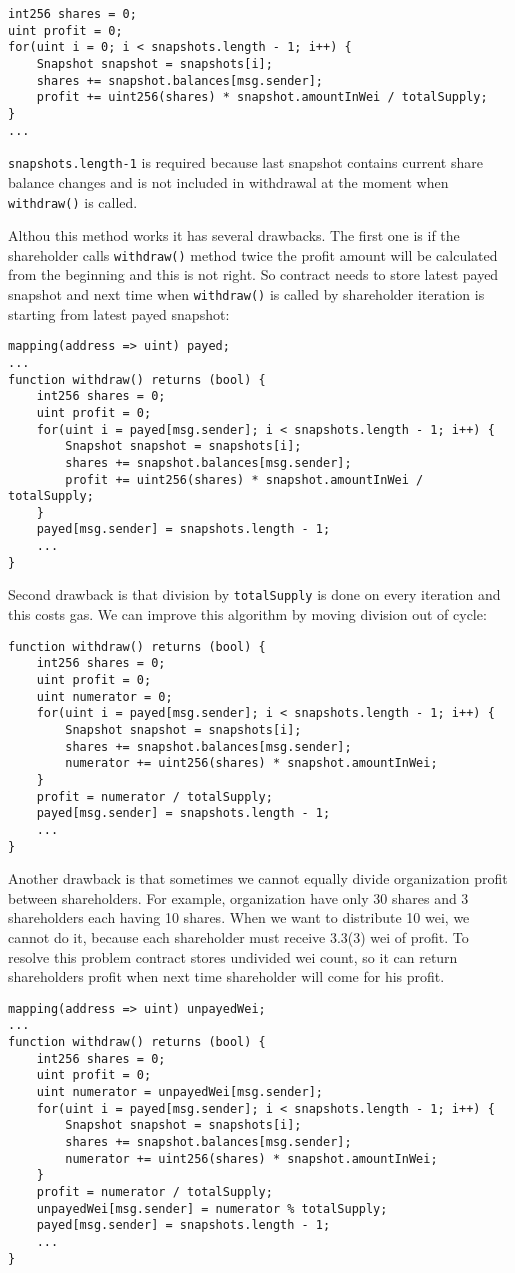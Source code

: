 \documentclass[onecolumn]{article}
\begin{document}
\begin{lstlisting}
int256 shares = 0;
uint profit = 0;
for(uint i = 0; i < snapshots.length - 1; i++) {
	Snapshot snapshot = snapshots[i];
	shares += snapshot.balances[msg.sender];
	profit += uint256(shares) * snapshot.amountInWei / totalSupply;
}
...
\end{lstlisting}
\lstinline{snapshots.length-1} is required because last snapshot contains current share balance changes and is not included in withdrawal at the moment when \lstinline{withdraw()} is called.

Althou this method works it has several drawbacks. The first one is if the shareholder calls \lstinline{withdraw()} method twice the profit amount will be calculated from the beginning and this is not right. So contract needs to store latest payed snapshot and next time when \lstinline{withdraw()} is called by shareholder iteration is starting from latest payed snapshot:
\begin{lstlisting}
mapping(address => uint) payed;
...
function withdraw() returns (bool) {
	int256 shares = 0;
	uint profit = 0;
	for(uint i = payed[msg.sender]; i < snapshots.length - 1; i++) {
		Snapshot snapshot = snapshots[i];
		shares += snapshot.balances[msg.sender];
		profit += uint256(shares) * snapshot.amountInWei / totalSupply;
	}
	payed[msg.sender] = snapshots.length - 1;
	...
}
\end{lstlisting}
Second drawback is that division by \lstinline{totalSupply} is done on every iteration and this costs gas. We can improve this algorithm by moving division out of cycle:
\begin{lstlisting}
function withdraw() returns (bool) {
	int256 shares = 0;
	uint profit = 0;
	uint numerator = 0;
	for(uint i = payed[msg.sender]; i < snapshots.length - 1; i++) {
		Snapshot snapshot = snapshots[i];
		shares += snapshot.balances[msg.sender];
		numerator += uint256(shares) * snapshot.amountInWei;
	}
	profit = numerator / totalSupply;
	payed[msg.sender] = snapshots.length - 1;
	...
}
\end{lstlisting}
Another drawback is that sometimes we cannot equally divide organization profit between shareholders. For example, organization have only 30 shares and 3 shareholders each having 10 shares. When we want to distribute 10 wei, we cannot do it, because each shareholder must receive 3.3(3) wei of profit. To resolve this problem contract stores undivided wei count, so it can return shareholders profit when next time shareholder will come for his profit.
\begin{lstlisting}
mapping(address => uint) unpayedWei;
...
function withdraw() returns (bool) {
	int256 shares = 0;
	uint profit = 0;
	uint numerator = unpayedWei[msg.sender];
	for(uint i = payed[msg.sender]; i < snapshots.length - 1; i++) {
		Snapshot snapshot = snapshots[i];
		shares += snapshot.balances[msg.sender];
		numerator += uint256(shares) * snapshot.amountInWei;
	}
	profit = numerator / totalSupply;
	unpayedWei[msg.sender] = numerator % totalSupply;
	payed[msg.sender] = snapshots.length - 1;
	...
}
\end{lstlisting}
\end{document}
